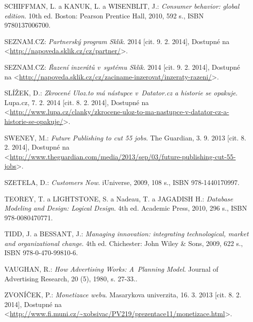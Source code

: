 \documentclass[12pt,twoside,openany]{fithesis}
\begin{document}
\begin{thebibliography}{99}
SCHIFFMAN, L. a KANUK, L. a WISENBLIT, J.: \emph{Consumer behavior: global edition}. 10th ed. Boston: Pearson Prentice Hall, 2010, 592 s., ISBN 9780137006700. 

SEZNAM.CZ: \emph{Partnerský program Sklik}. 2014 [cit. 9. 2. 2014], Dostupné na {\textless}\url{http://napoveda.sklik.cz/cz/partner/}{\textgreater}.

SEZNAM.CZ: \emph{Řazení inzerátů v~systému Sklik}. 2014 [cit. 9. 2. 2014], Dostupné na {\textless}\url{http://napoveda.sklik.cz/cz/zaciname-inzerovat/inzeraty-razeni/}{\textgreater}.

SLÍŽEK, D.: \emph{Zkrocené Uloz.to má nástupce v~Datator.cz a historie se opakuje}. Lupa.cz, 7. 2. 2014 [cit. 8. 2. 2014], Dostupné na {\textless}\url{http://www.lupa.cz/clanky/zkrocene-uloz-to-ma-nastupce-v-datator-cz-a-historie-se-opakuje/}{\textgreater}.

SWENEY, M.: \emph{Future Publishing to cut 55 jobs}. The Guardian, 3. 9. 2013 [cit. 8. 2. 2014], Dostupné na {\textless}\url{http://www.theguardian.com/media/2013/sep/03/future-publishing-cut-55-jobs}{\textgreater}.

SZETELA, D.: \emph{Customers Now}. iUniverse, 2009, 108 s., ISBN 978-1440170997. 

TEOREY, T. a LIGHTSTONE, S. a Nadeau, T. a JAGADISH H.: 
\emph{Database Modeling and Design: Logical Design}. 4th ed. Academic Press, 2010, 296 s., ISBN 978-0080470771.

TIDD, J. a BESSANT, J.: \emph{Managing innovation: integrating technological, market and
      organizational change}. 4th ed. Chichester: John Wiley \& Sons, 2009, 622 s., ISBN 978-0-470-99810-6.

VAUGHAN, R.: \emph{How Advertising Works: A~Planning Model}. Journal of Advertising Research, 20 (5), 1980, s. 27-33..

ZVONÍČEK, P.: \emph{Monetizace webu}. Masarykova univerzita, 16. 3. 2013 [cit. 8. 2. 2014], Dostupné na {\textless}\url{http://www.fi.muni.cz/~xobsivac/PV219/prezentace11/monetizace.html}{\textgreater}.

\end{thebibliography}


\newpage

\end{document}
